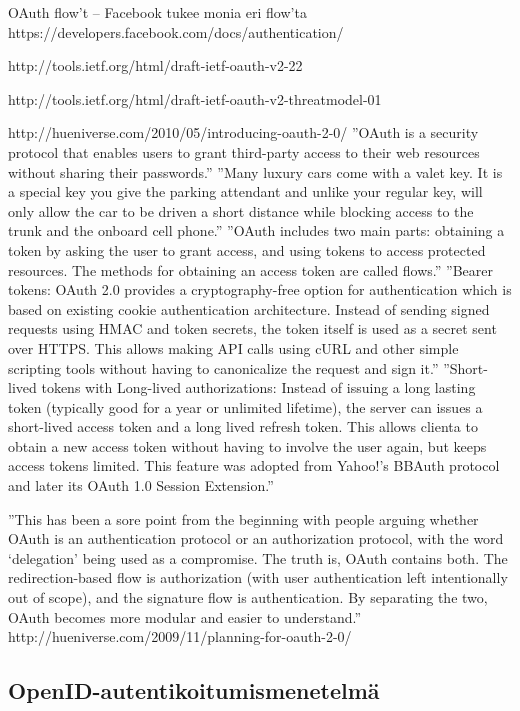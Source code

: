 \documentclass[english,gradu]{tktltiki}
\begin{document}
OAuth flow't -- Facebook tukee monia eri flow'ta https://developers.facebook.com/docs/authentication/

http://tools.ietf.org/html/draft-ietf-oauth-v2-22

http://tools.ietf.org/html/draft-ietf-oauth-v2-threatmodel-01

http://hueniverse.com/2010/05/introducing-oauth-2-0/
''OAuth is a security protocol that enables users to grant third-party access to their web resources without sharing their passwords.''
''Many luxury cars come with a valet key. It is a special key you give the parking attendant and unlike your regular key, will only allow the car to be driven a short distance while blocking access to the trunk and the onboard cell phone.''
''OAuth includes two main parts: obtaining a token by asking the user to grant access, and using tokens to access protected resources. The methods for obtaining an access token are called flows.''
''Bearer tokens: OAuth 2.0 provides a cryptography-free option for authentication which is based on existing cookie authentication architecture. Instead of sending signed requests using HMAC and token secrets, the token itself is used as a secret sent over HTTPS. This allows making API calls using cURL and other simple scripting tools without having to canonicalize the request and sign it.''
''Short-lived tokens with Long-lived authorizations: Instead of issuing a long lasting token (typically good for a year or unlimited lifetime), the server can issues a short-lived access token and a long lived refresh token. This allows clienta to obtain a new access token without having to involve the user again, but keeps access tokens limited. This feature was adopted from Yahoo!’s BBAuth protocol and later its OAuth 1.0 Session Extension.''


''This has been a sore point from the beginning with people arguing whether OAuth is an authentication protocol or an authorization protocol, with the word ‘delegation’ being used as a compromise. The truth is, OAuth contains both. The redirection-based flow is authorization (with user authentication left intentionally out of scope), and the signature flow is authentication. By separating the two, OAuth becomes more modular and easier to understand.'' http://hueniverse.com/2009/11/planning-for-oauth-2-0/



\subsection{OpenID-autentikoitumismenetelmä} %
\label{sub:openid_autentikoitumismenetelmä}
\end{document}
